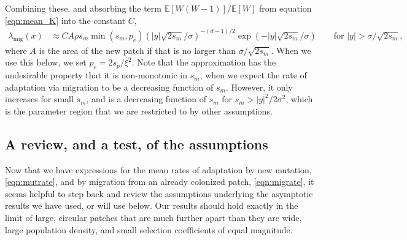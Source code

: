 \documentclass{article}
\newcommand{\linelabel}[1]{}
\newcommand{\E}{\mathbb{E}}
\newcommand{\migrate}{\lambda_\text{mig}}
\begin{document}
Combining these, and absorbing the term $\E[W(W-1)]/\E[W]$ from equation \eqref{eqn:mean_K} 
into the constant $C$,
\begin{align} \label{eqn:migrate}
  \migrate(x) &\approx C A \rho s_m \min(s_m,p_e) \left( |y| \sqrt{2 s_m}/\sigma \right)^{-(d-1)/2} \exp( - |y| \sqrt{2 s_m} / \sigma)  \qquad \text{for } |y| > \sigma/\sqrt{2 s_m}  ,
\end{align}
where $A$ is the area of the new patch if that is no larger than $\sigma/\sqrt{2s_m}$.
When we use this below, we set $p_e = 2 s_p / \xi^2$.
Note that the approximation has the undesirable property that it is
non-monotonic in $s_m$, when we expect the rate of adaptation via
migration to be a decreasing function of $s_m$. However, it only increases for small $s_m$, 
and is a decreasing function of $s_m$ for $s_m > |y|^2 / 2 \sigma^2$, 
which is the parameter region that we are restricted to by other assumptions.
\linelabel{rr:sm_condition}


\subsection{A review, and a test, of the assumptions}
\label{ss:assumptions}

Now that we have expressions for the mean rates of adaptation by new mutation, \eqref{eqn:mutrate},
and by migration from an already colonized patch, \eqref{eqn:migrate},
it seems helpful to step back and review the assumptions 
underlying the asymptotic results we have used, or will use below.
Our results should hold exactly in the limit of 
large, circular patches that are much further apart than they are wide,
large population density,
and small selection coefficients of equal magnitude.
\end{document}
